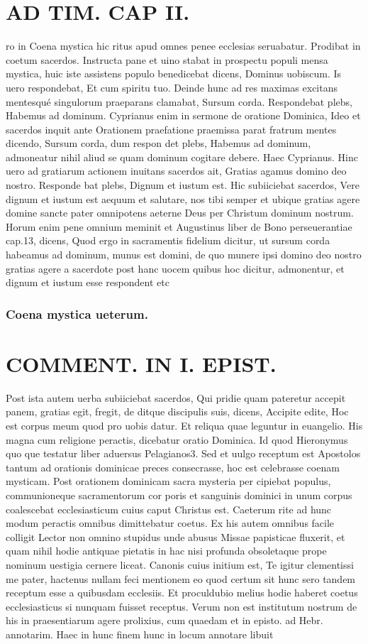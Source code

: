 \documentclass{article}
\begin{document}
\begin{pages}
\section*{AD TIM. CAP II. }
\marginpar{[ p.109 ]}\pstart ro in Coena mystica hic ritus apud omnes penee ecclesias seruabatur. Prodibat in coetum sacerdos. Instructa pane et uino stabat in prospectu populi mensa mystica, huic iste assistens populo benedicebat dicens, Dominus uobiscum. Is uero respondebat, Et cum spiritu tuo. Deinde hunc ad res maximas excitans mentesqué singulorum praeparans clamabat, Sursum corda. Respondebat plebs, Habemus ad dominum. Cyprianus enim in sermone de oratione Dominica, Ideo et sacerdos inquit ante Orationem praefatione praemissa parat fratrum mentes dicendo, Sursum corda, dum respon det plebs, Habemus ad dominum, admoneatur nihil aliud se quam dominum cogitare debere. Haec Cyprianus. Hinc uero ad gratiarum actionem inuitans sacerdos ait, Gratias agamus domino deo nostro. Responde bat plebs, Dignum et iustum est. Hic subiiciebat sacerdos, Vere dignum et iustum est aequum et salutare, nos tibi semper et ubique gratias agere domine sancte pater omnipotens aeterne Deus per Christum dominum nostrum. Horum enim pene omnium meminit et Augustinus liber  de Bono perseuerantiae cap.13, dicens, Quod ergo in sacramentis fidelium dicitur, ut sursum corda habeamus ad dominum, munus est domini, de quo munere ipsi domino deo nostro gratias agere a sacerdote post hanc uocem quibus hoc dicitur, admonentur, et dignum et iustum esse respondent etc  \pend
\subsubsection*{Coena mystica ueterum. }
\section*{COMMENT. IN I. EPIST. }\pstart Post ista autem uerba subiiciebat sacerdos, Qui pridie quam pateretur accepit panem, gratias egit, fregit, de ditque discipulis suis, dicens, Accipite edite, Hoc est corpus meum quod pro uobis datur. Et reliqua quae leguntur in euangelio. His magna cum religione peractis, dicebatur oratio Dominica. Id quod Hieronymus quo que testatur liber  aduersus Pelagianos3. Sed et uulgo receptum est Apostolos tantum ad orationis dominicae preces consecrasse, hoc est celebrasse coenam mysticam. Post orationem dominicam sacra mysteria per cipiebat populus, communioneque sacramentorum cor poris et sanguinis dominici in unum corpus coalescebat ecclesiasticum cuius caput Christus est. Caeterum rite ad hunc modum peractis omnibus dimittebatur coetus. Ex his autem omnibus facile colligit Lector non omnino stupidus unde abusus Missae papisticae fluxerit, et quam nihil hodie antiquae pietatis in hac nisi profunda obsoletaque prope nominum uestigia cernere liceat. Canonis cuius initium est, Te igitur clementissi me pater, hactenus nullam feci mentionem eo quod certum sit hunc sero tandem receptum esse a quibusdam ecclesiis. Et proculdubio melius hodie haberet coetus ecclesiasticus si nunquam fuisset receptus. Verum non est institutum nostrum de his in praesentiarum agere prolixius, cum quaedam et in episto. ad Hebr. annotarim. Haec in hunc finem hunc in locum annotare libuit  \pend

\end{pages}
\end{document}
